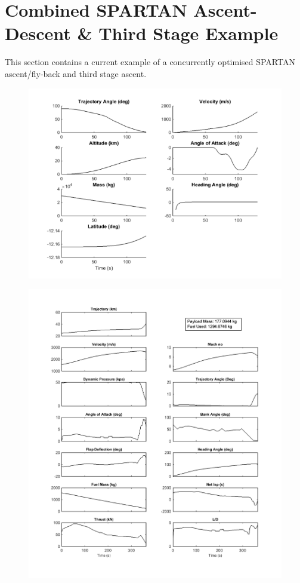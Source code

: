 \section{Combined SPARTAN Ascent-Descent \& Third Stage Example}

This section contains a current example of a concurrently optimised SPARTAN ascent/fly-back and third stage ascent. 


\begin{figure}
\centering
\includegraphics[width=1\linewidth]{figures/6_FlyBack/mode1/FirstStageStandard}
\caption{}
\label{fig:FirstStageStandard}
\end{figure}



\begin{figure}
\centering
\includegraphics[width=1\linewidth]{figures/6_FlyBack/mode1/SecondStageStandard}
\caption{}
\label{fig:SecondStageStandard}
\end{figure}


